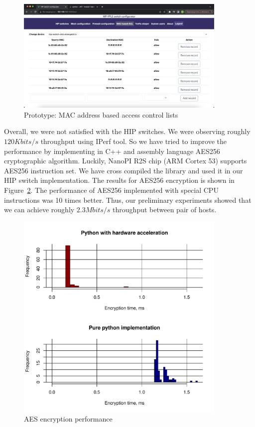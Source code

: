 \begin{figure}[h!]
\centering
\includegraphics[width=0.9\textwidth]{graphics/MAC-ACL.png}
\caption{Prototype: MAC address based access control lists}
\label{fig:mac}
\end{figure}



Overall, we were not satisfied with the HIP switches. We were observing roughly $120 Kbits/s$ throughput
using IPerf tool. So we have tried to improve the performance by implementing in C++ and assembly language
AES256 cryptographic algorithm. Luckily, NanoPI R2S chip (ARM Cortex 53) supports AES256 instruction set.
We have cross compiled the library and used it in our HIP switch implementation. The results for AES256 
encryption is shown in Figure~\ref{fig:aes}. The performance of AES256 implemented with special CPU 
instructions was 10 times better. Thus, our preliminary experiments showed that we can achieve roughly 
$2.3 Mbits/s$ throughput between pair of hosts.

\begin{figure}[h!]
\centering
\includegraphics[width=0.9\textwidth]{graphics/AES.pdf}
\caption{AES encryption performance}
\label{fig:aes}
\end{figure}





